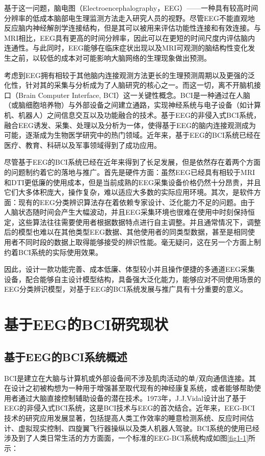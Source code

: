 基于这一问题，脑电图（Electroencephalography，EEG）——一种具有较高时间分辨率的低成本脑部电生理监测方法走入研究人员的视野。尽管EEG不能直观地反应脑内神经解剖学连接结构，但是其可以被用来评估功能性连接和有效连接。与MRI相比，EEG具有更高的时间分辨率，因此可以在更短的时间尺度内评估脑内连通性。与此同时，EEG能够在临床症状出现以及MRI可观测的脑结构性变化发生之前，以较低的成本对可能影响大脑网络的生理现象做出预测\cite{1-8,1-9}。

考虑到EEG拥有相较于其他脑内连接观测方法更长的生理预测周期以及更强的泛化性，针对其的采集与分析成为了人脑研究的核心之一。而这一切，离不开脑机接口（Brain Computer Interface, BCI）这一关键性概念。BCI是一种通过在人脑（或脑细胞培养物）与外部设备之间建立通路，实现神经系统与电子设备（如计算机、机器人）之间信息交互以及功能融合的技术\cite{1-104,1-101}。基于EEG的非侵入式BCI系统，融合EEG诱发、采集、处理以及分析为一体，使得基于EEG的脑内连接观测成为可能，逐渐成为生物医学研究中的热门领域。近年来，基于EEG的BCI系统已经在医疗、教育、科研以及军事领域得到了成功应用\cite{1-16,1-17,1-18}。

尽管基于EEG的BCI系统已经在近年来得到了长足发展，但是依然存在着两个方面的问题制约着它的落地与推广。首先是硬件方面：虽然EEG已经具有相较于MRI和DTI更低廉的使用成本，但是当前成熟的EEG采集设备价格仍然十分昂贵，并且它们大多体积庞大，操作复杂，难以适应大多数的实际应用环境。其次，是软件方面：现有的EEG分类辨识算法存在着依赖专家设计、泛化能力不足的问题。由于人脑状态随时间会产生大幅波动，并且EEG采集环境也很难在使用中时刻保持恒定，这些算法往往需要使用者根据数据特点进行自主调整。并且通常情况下，调整后的模型也难以在其他类型EEG数据、其他使用者的同类型数据，甚至是相同使用者不同时段的数据上取得能够接受的辨识性能。毫无疑问，这在另一个方面上制约着BCI系统的实际使用效果。

因此，设计一款功能完善、成本低廉、体型较小并且操作便捷的多通道EEG采集设备，配合能够自主设计模型结构，具备强大泛化能力，能够应对不同使用场景的EEG分类辨识模型，对基于EEG的BCI系统发展与推广具有十分重要的意义。

\section{基于EEG的BCI研究现状}
\subsection{基于EEG的BCI系统概述}
BCI是建立在大脑与计算机或外部设备间不涉及肌肉活动的单/双向通信连接\cite{1-100}。其在设计之初被构想为一种用于增强甚至取代现有的神经康复系统，或者能够帮助使用者通过大脑直接控制辅助设备的潜在技术。1973年，J.J.Vidal设计出了基于EEG的非侵入式BCI系统\cite{1-22}，这是BCI技术与EEG的首次结合。近年来，EEG-BCI技术的研究应用发展显著，包括提高人类工作效率的睡意检测系统\cite{1-23,3-18}、反应时间估计\cite{1-24}、虚拟现实控制\cite{1-25}、四旋翼飞行器操纵\cite{1-26}以及类人机器人驾驶\cite{1-27}。BCI系统的使用已经涉及到了人类日常生活的方方面面，一个标准的EEG-BCI系统构成如图\ref{fig1-1}所示：


